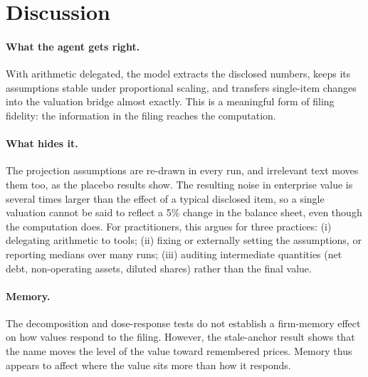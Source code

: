 \documentclass[11pt]{article}
\begin{document}
\section{Discussion}

\paragraph{What the agent gets right.} With arithmetic delegated, the model extracts the disclosed numbers, keeps its assumptions stable under proportional scaling, and transfers single-item changes into the valuation bridge almost exactly. This is a meaningful form of filing fidelity: the information in the filing reaches the computation.

\paragraph{What hides it.} The projection assumptions are re-drawn in every run, and irrelevant text moves them too, as the placebo results show. The resulting noise in enterprise value is several times larger than the effect of a typical disclosed item, so a single valuation cannot be said to reflect a 5\% change in the balance sheet, even though the computation does. For practitioners, this argues for three practices: (i) delegating arithmetic to tools; (ii) fixing or externally setting the assumptions, or reporting medians over many runs; (iii) auditing intermediate quantities (net debt, non-operating assets, diluted shares) rather than the final value.

\paragraph{Memory.} The decomposition and dose-response tests do not establish a firm-memory effect on how values respond to the filing. However, the stale-anchor result shows that the name moves the level of the value toward remembered prices. Memory thus appears to affect where the value sits more than how it responds.
\end{document}
